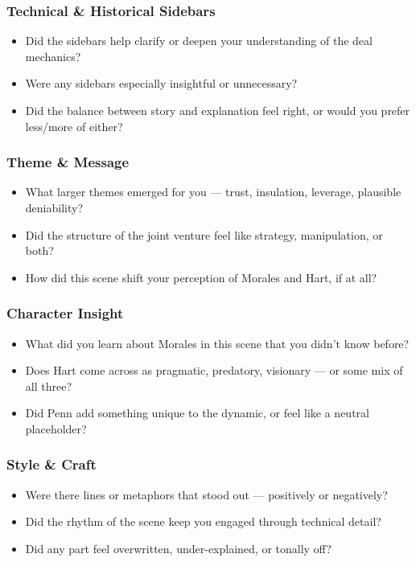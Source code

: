 \subsubsection{Technical \& Historical Sidebars}

\begin{itemize}
  \item Did the sidebars help clarify or deepen your understanding of the deal mechanics?
  \item Were any sidebars especially insightful or unnecessary?
  \item Did the balance between story and explanation feel right, or would you prefer less/more of either?
\end{itemize}

\subsubsection{Theme \& Message}

\begin{itemize}
  \item What larger themes emerged for you — trust, insulation, leverage, plausible deniability?
  \item Did the structure of the joint venture feel like strategy, manipulation, or both?
  \item How did this scene shift your perception of Morales and Hart, if at all?
\end{itemize}

\subsubsection{Character Insight}

\begin{itemize}
  \item What did you learn about Morales in this scene that you didn’t know before?
  \item Does Hart come across as pragmatic, predatory, visionary — or some mix of all three?
  \item Did Penn add something unique to the dynamic, or feel like a neutral placeholder?
\end{itemize}

\subsubsection{Style \& Craft}

\begin{itemize}
  \item Were there lines or metaphors that stood out — positively or negatively?
  \item Did the rhythm of the scene keep you engaged through technical detail?
  \item Did any part feel overwritten, under-explained, or tonally off?
\end{itemize}

